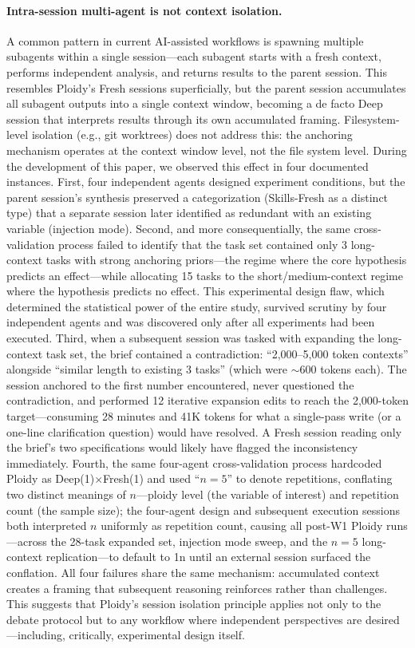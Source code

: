 \documentclass[11pt]{article}
\begin{document}
\paragraph{Intra-session multi-agent is not context isolation.}
A common pattern in current AI-assisted workflows is spawning multiple subagents within a single session---each subagent starts with a fresh context, performs independent analysis, and returns results to the parent session. This resembles Ploidy's Fresh sessions superficially, but the parent session accumulates all subagent outputs into a single context window, becoming a de facto Deep session that interprets results through its own accumulated framing. Filesystem-level isolation (e.g., git worktrees) does not address this: the anchoring mechanism operates at the context window level, not the file system level. During the development of this paper, we observed this effect in four documented instances. First, four independent agents designed experiment conditions, but the parent session's synthesis preserved a categorization (Skills-Fresh as a distinct type) that a separate session later identified as redundant with an existing variable (injection mode). Second, and more consequentially, the same cross-validation process failed to identify that the task set contained only 3 long-context tasks with strong anchoring priors---the regime where the core hypothesis predicts an effect---while allocating 15 tasks to the short/medium-context regime where the hypothesis predicts no effect. This experimental design flaw, which determined the statistical power of the entire study, survived scrutiny by four independent agents and was discovered only after all experiments had been executed. Third, when a subsequent session was tasked with expanding the long-context task set, the brief contained a contradiction: ``2,000--5,000 token contexts'' alongside ``similar length to existing 3 tasks'' (which were $\sim$600 tokens each). The session anchored to the first number encountered, never questioned the contradiction, and performed 12 iterative expansion edits to reach the 2,000-token target---consuming 28 minutes and 41K tokens for what a single-pass write (or a one-line clarification question) would have resolved. A Fresh session reading only the brief's two specifications would likely have flagged the inconsistency immediately. Fourth, the same four-agent cross-validation process hardcoded Ploidy as Deep(1)$\times$Fresh(1) and used ``$n{=}5$'' to denote repetitions, conflating two distinct meanings of $n$---ploidy level (the variable of interest) and repetition count (the sample size); the four-agent design and subsequent execution sessions both interpreted $n$ uniformly as repetition count, causing all post-W1 Ploidy runs---across the 28-task expanded set, injection mode sweep, and the $n{=}5$ long-context replication---to default to 1n until an external session surfaced the conflation. All four failures share the same mechanism: accumulated context creates a framing that subsequent reasoning reinforces rather than challenges. This suggests that Ploidy's session isolation principle applies not only to the debate protocol but to any workflow where independent perspectives are desired---including, critically, experimental design itself.
\end{document}
